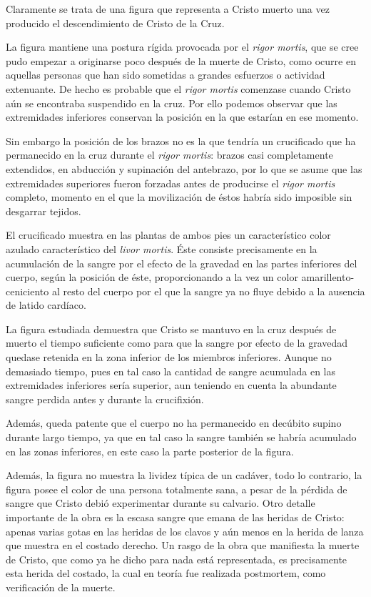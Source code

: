 Claramente se trata de una figura que representa a Cristo muerto una vez producido el descendimiento de Cristo de la Cruz.

La figura mantiene una postura rígida provocada por el \textit{rigor mortis}, que se cree pudo empezar a originarse poco después de la muerte de Cristo, como ocurre en aquellas personas que han sido sometidas a grandes esfuerzos o actividad extenuante. De hecho es probable que el \textit{rigor mortis} comenzase cuando Cristo aún se encontraba suspendido en la cruz. Por ello podemos observar que las extremidades inferiores conservan la posición en la que estarían en ese momento.

Sin embargo la posición de los brazos no es la que tendría un crucificado que ha permanecido en la cruz durante el \textit{rigor mortis}: brazos casi completamente extendidos, en abducción y supinación del antebrazo, por lo que se asume que las extremidades superiores fueron forzadas antes de producirse el \textit{rigor mortis} completo, momento en el que la movilización de éstos habría sido imposible sin desgarrar tejidos.

El crucificado muestra en las plantas de ambos pies un característico color azulado característico del \textit{livor mortis}. Éste consiste precisamente en la acumulación de la sangre por el efecto de la gravedad en las partes inferiores del cuerpo, según la posición de éste, proporcionando a la vez un color amarillento-ceniciento al resto del cuerpo por el que la sangre ya no fluye debido a la ausencia de latido cardíaco.

La figura estudiada demuestra que Cristo se mantuvo en la cruz después de muerto el tiempo suficiente como para que la sangre por efecto de la gravedad quedase retenida en la zona inferior de los miembros inferiores. Aunque no demasiado tiempo, pues en tal caso la cantidad de sangre acumulada en las extremidades inferiores sería superior, aun teniendo en cuenta la abundante sangre perdida antes y durante la crucifixión.

Además, queda patente que el cuerpo no ha permanecido en decúbito supino durante largo tiempo, ya que en tal caso la sangre también se habría acumulado en las zonas inferiores, en este caso la parte posterior de la figura.



Además, la figura no muestra la lividez típica de un cadáver, todo lo contrario, la figura posee el color de una persona totalmente sana, a pesar de la pérdida de sangre que Cristo debió experimentar durante su calvario. Otro detalle importante de la obra es la escasa sangre que emana de las heridas de Cristo: apenas varias gotas en las heridas de los clavos y aún menos en la herida de lanza que muestra en el costado derecho. Un rasgo de la obra que  manifiesta la muerte de Cristo, que como ya he dicho para nada está representada, es precisamente esta herida del costado, la cual en teoría fue realizada postmortem, como verificación de la muerte.

